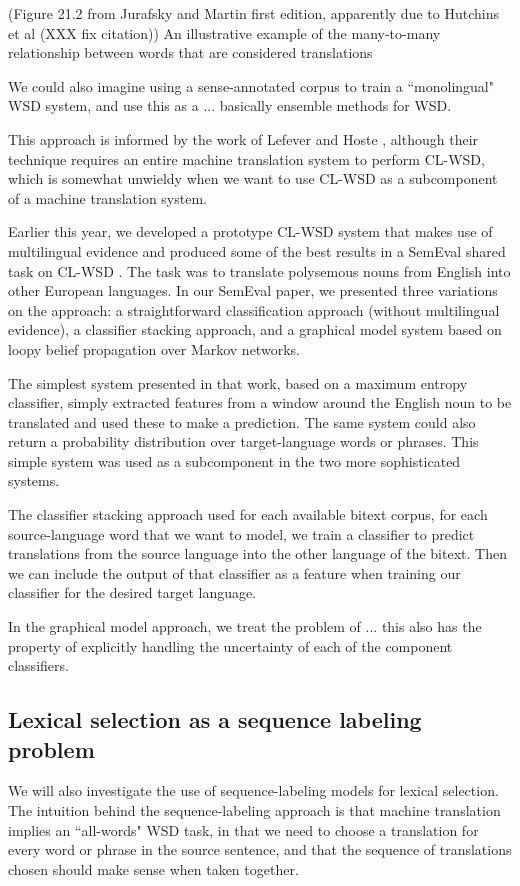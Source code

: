 (Figure 21.2 from Jurafsky and Martin first edition, apparently due to Hutchins
et al (XXX fix citation))
An illustrative example of the many-to-many relationship between words that are
considered translations
\cite[chap 21]{slp1}

We could also imagine using a sense-annotated corpus to train a ``monolingual"
WSD system, and use this as a 
... basically ensemble methods for WSD.

This approach is informed by the work of Lefever and Hoste
\cite{lefever-hoste-decock:2011:ACL-HLT2011}, although their technique requires
an entire machine translation system to perform CL-WSD, which is somewhat
unwieldy when we want to use CL-WSD as a subcomponent of a machine translation
system.

Earlier this year, we developed a prototype CL-WSD system that makes use of
multilingual evidence \cite{rudnick-liu-gasser:2013:SemEval-2013} and produced
some of the best results in a SemEval shared task on CL-WSD \cite{task10}.
The task was to translate polysemous nouns from English into other European
languages. In our SemEval paper, we presented three variations on the approach:
a straightforward classification approach (without multilingual evidence), a
classifier stacking approach, and a graphical model system based on loopy
belief propagation over Markov networks.

The simplest system presented in that work, based on a maximum entropy
classifier, simply extracted features from a window around the English noun to
be translated and used these to make a prediction. The same system could also
return a probability distribution over target-language words or phrases. This
simple system was used as a subcomponent in the two more sophisticated systems.

The classifier stacking approach used 
for each available bitext corpus, for each source-language word that we want to
model, we train a classifier to predict translations from the source language
into the other language of the bitext.
Then we can include the output of that classifier as a feature when training
our classifier for the desired target language.


In the graphical model approach, we treat the problem of 
... this also has the property of explicitly handling the uncertainty of each
of the component classifiers.

\subsection{Lexical selection as a sequence labeling problem}
We will also investigate the use of sequence-labeling models for lexical
selection.  The intuition behind the sequence-labeling approach is that machine
translation implies an ``all-words" WSD task, in that we need to choose a
translation for every word or phrase in the source sentence, and that the
sequence of translations chosen should make sense when taken together.

